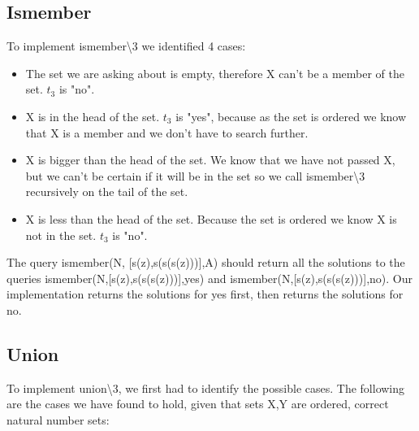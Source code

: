 \documentclass[]{article}
\begin{document}
\subsection{Ismember} %
\label{sec:ismember}
To implement ismember\textbackslash3 we identified 4 cases:
\begin{itemize}
	\item The set we are asking about is empty, therefore X can't be a member of the set. $t_3$ is "no".
	\item X is in the head of the set. $t_3$ is "yes", because as the set is ordered we know that X is a member and we don't have to search further.
	\item X is bigger than the head of the set. We know that we have not passed X, but we can't be certain if it will be in the set so we call ismember\textbackslash3 recursively on the tail of the set.
	\item X is less than the head of the set. Because the set is ordered we know X is not in the set. $t_3$ is "no".
\end{itemize}
The query ismember(N, [s(z),s(s(s(z)))],A) should return all the solutions to the queries ismember(N,[s(z),s(s(s(z)))],yes) and ismember(N,[s(z),s(s(s(z)))],no). Our implementation returns the solutions for yes first, then returns the solutions for no. 
\subsection{Union} %
\label{sec:union}

To implement union\textbackslash3, we first had to identify the possible cases. The following are the cases we have found to hold, given that sets X,Y are ordered, correct natural number sets:
\end{document}
